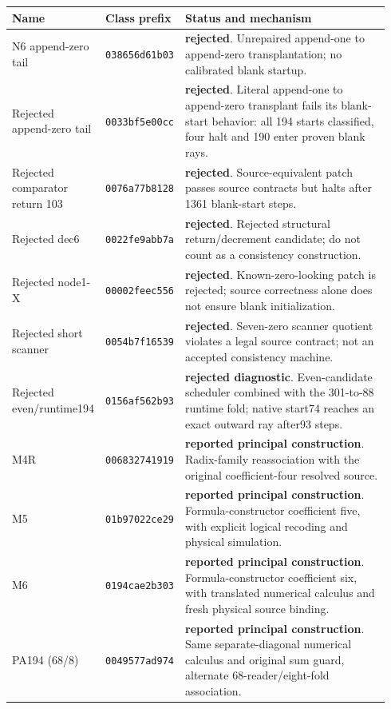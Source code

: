 {\footnotesize
\begin{longtable}{@{}>{\raggedright\arraybackslash}p{0.23\linewidth}>{\raggedright\arraybackslash}p{0.145\linewidth}>{\raggedright\arraybackslash}p{0.56\linewidth}@{}}
\toprule Name & Class prefix & Status and mechanism\\\midrule\endhead
N6 append-zero tail & \texttt{038656d61b03} & \textbf{rejected}. Unrepaired append-one to append-zero transplantation; no calibrated blank startup.\\[4pt]
Rejected append-zero tail & \texttt{0033bf5e00cc} & \textbf{rejected}. Literal append-one to append-zero transplant fails its blank-start behavior: all 194 starts classified, four halt and 190 enter proven blank rays.\\[4pt]
Rejected comparator return 103 & \texttt{0076a77b8128} & \textbf{rejected}. Source-equivalent patch passes source contracts but halts after 1361 blank-start steps.\\[4pt]
Rejected dec6 & \texttt{0022fe9abb7a} & \textbf{rejected}. Rejected structural return/decrement candidate; do not count as a consistency construction.\\[4pt]
Rejected node1-X & \texttt{00002feec556} & \textbf{rejected}. Known-zero-looking patch is rejected; source correctness alone does not ensure blank initialization.\\[4pt]
Rejected short scanner & \texttt{0054b7f16539} & \textbf{rejected}. Seven-zero scanner quotient violates a legal source contract; not an accepted consistency machine.\\[4pt]
Rejected even/runtime194 & \texttt{0156af562b93} & \textbf{rejected diagnostic}. Even-candidate scheduler combined with the 301-to-88 runtime fold; native start74 reaches an exact outward ray after93 steps.\\[4pt]
M4R & \texttt{006832741919} & \textbf{reported principal construction}. Radix-family reassociation with the original coefficient-four resolved source.\\[4pt]
M5 & \texttt{01b97022ce29} & \textbf{reported principal construction}. Formula-constructor coefficient five, with explicit logical recoding and physical simulation.\\[4pt]
M6 & \texttt{0194cae2b303} & \textbf{reported principal construction}. Formula-constructor coefficient six, with translated numerical calculus and fresh physical source binding.\\[4pt]
PA194 (68/8) & \texttt{0049577ad974} & \textbf{reported principal construction}. Same separate-diagonal numerical calculus and original sum guard, alternate 68-reader/eight-fold association.\\[4pt]

\end{longtable}}

